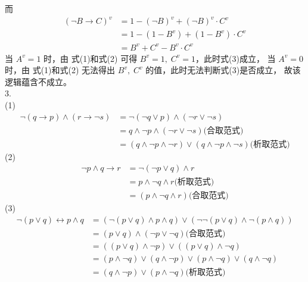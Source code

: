 \documentclass{article}
\begin{document}
而
\begin{equation}
    \begin{split}
        (\neg B \to C)^v & = 1 - (\neg B)^v + (\neg B)^v \cdot C^v \\
                         & = 1 - (1 - B^v) + (1 - B^v) \cdot C^v \\
                         & = B^v + C^v - B^v \cdot C^v 
    \end{split}    
\end{equation}
当 $A^v = 1$ 时，由 式(1)和式(2) 可得 $B^v = 1, \; C^v = 1$，此时式(3)成立，
当 $A^v = 0$ 时，由 式(1)和式(2) 无法得出 $B^v, \; C^v$ 的值，此时无法判断式(3)是否成立，
故该逻辑蕴含不成立。\\
3.\\
(1)
\[
\begin{aligned}
    \neg(q \to p) \wedge (r \to \neg s) & = \neg (\neg q \vee p) \wedge (\neg r \vee \neg s) \\
                                        & = q \wedge \neg p \wedge (\neg r \vee \neg s) \mbox{(合取范式)}\\
                                        & = (q \wedge \neg p \wedge \neg r) \vee (q \wedge \neg p \wedge \neg s) \mbox{(析取范式)}
\end{aligned}    
\]
(2)
\[
\begin{aligned}
    \neg p \wedge q \to r & = \neg (\neg p \vee q) \wedge r \\
                          & = p \wedge \neg q \wedge r \mbox{(析取范式)} \\
                          & = (p \wedge \neg q \wedge r) \mbox{(合取范式)} 
\end{aligned}    
\]
(3)\
\[
\begin{aligned}
    \neg (p \vee q) \leftrightarrow p \wedge q & = (\neg (p \vee q) \wedge p \wedge q) \vee (\neg \neg(p \vee q) \wedge \neg (p \wedge q)) \\
                                               & = (p \vee q) \wedge (\neg p \vee \neg q)\mbox{(合取范式)} \\
                                               & = ((p \vee q) \wedge \neg p) \vee ((p \vee q) \wedge \neg q) \\
                                               & = (p \wedge \neg q) \vee (q \wedge \neg p) \vee (p \wedge \neg q) \vee (q \wedge \neg q) \\
                                               & = (q \wedge \neg p) \vee (p \wedge \neg q)\mbox{(析取范式)}
\end{aligned}    
\]
\end{document}
